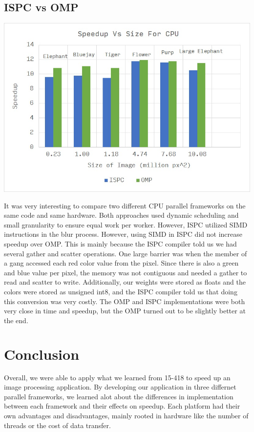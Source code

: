 \documentclass[12pt]{article}
\begin{document}
\subsection{ISPC vs OMP}
\begin{center}
\includegraphics[scale=0.8]{cpu.jpg}
\end{center}

It was very interesting to compare two different CPU parallel frameworks on the
same code and same hardware. Both approaches used dynamic scheduling and
small granularity to ensure equal work per worker. However, ISPC utilized SIMD
instructions in the blur process. However, using SIMD in ISPC did not increase
speedup over OMP. This is mainly because the ISPC compiler told us we had
several gather and scatter operations. One large barrier was when the member of
a gang accessed each red color value from the pixel. Since there is also a
green and blue value per pixel, the memory was not contiguous and needed
a gather to read and scatter to write. Additionally, our weights were stored
as floats and the colors were stored as unsigned int8, and the ISPC compiler
told us that doing this conversion was very costly. The OMP and ISPC
implementations were both very close in time and speedup, but the OMP turned out
to be slightly better at the end.

\section{Conclusion}
Overall, we were able to apply what we learned from 15-418 to speed up an
image processing application. By developing our application in three
differnet parallel frameworks, we learned alot about the differences in
implementation between each framework and their effects on speedup. Each
platform had their own advantages and disadvantages, mainly rooted in hardware
like the number of threads or the cost of data transfer.
\end{document}
